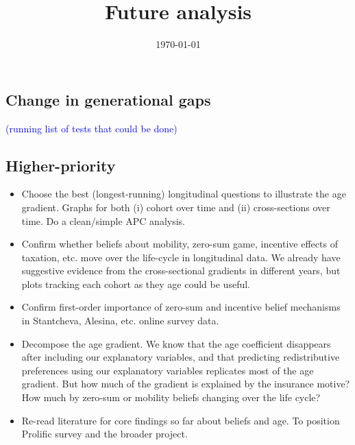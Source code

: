 \documentclass{article}
\title{Future analysis}
\date{\today}
\newcommand{\blue}[1]{\textcolor{blue}{#1}}
\begin{document}
\maketitle

\subsection*{Change in generational gaps}


\blue{(running list of tests that could be done)}
\subsection*{Higher-priority}

\begin{itemize}
    \item Choose the best (longest-running) longitudinal questions to illustrate the age gradient. Graphs for both (i) cohort over time and (ii) cross-sections over time. Do a clean/simple APC analysis.
    \item Confirm whether beliefs about mobility, zero-sum game, incentive effects of taxation, etc. move over the life-cycle in longitudinal data. We already have suggestive evidence from the cross-sectional gradients in different years, but plots tracking each cohort as they age could be useful.  
    \item Confirm first-order importance of zero-sum and incentive belief mechanisms in Stantcheva, Alesina, etc. online survey data. 
    \item Decompose the age gradient. We know that the age coefficient disappears after including our explanatory variables, and that predicting redistributive preferences using our explanatory variables replicates most of the age gradient. But how much of the gradient is explained by the insurance motive? How much by zero-sum or mobility beliefs changing over the life cycle?
    \item Re-read literature for core findings so far about beliefs and age. To position Prolific survey and the broader project.
\end{itemize}
\end{document}
